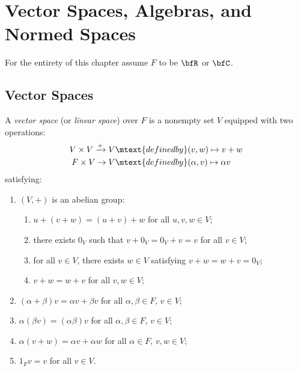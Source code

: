 \chapter{Vector Spaces, Algebras, and Normed Spaces}

\noindent For the entirety of this chapter assume $F$ to be  $\bfR$ or $\bfC$.

\section{Vector Spaces}
    \begin{definition}
        A \textit{vector space} (or \textit{linear space}) over $F$ is a nonempty set $V$ equipped with two operations:
            \begin{equation*}
            \begin{split}
                V \times V \xrightarrow{+} V &\mtext{defined by} (v,w) \mapsto v+w \\
                F \times V \rightarrow V &\mtext{defined by} (\alpha,v) \mapsto \alpha v
            \end{split}
            \end{equation*}
        satisfying:
            \begin{enumerate}[label = (\arabic*),itemsep=1pt,topsep=3pt]
                \item $(V, +)$ is an abelian group:
                    \begin{enumerate}[label = (\roman*),itemsep=1pt,topsep=3pt]
                        \item $u + (v+w) = (u+v) + w$ for all $u,v,w \in V$;
                        \item there exists $0_V$ such that $v + 0_V = 0_V + v = v$ for all $v \in V$;
                        \item for all $v \in V$, there exists $w \in V$ satisfying $v+w = w+v = 0_V$;
                        \item $v + w = w+v$ for all $v,w \in V$;
                    \end{enumerate}

                \item $(\alpha + \beta)v = \alpha v + \beta v$ for all $\alpha,\beta \in F$, $v \in V$;
                \item $\alpha(\beta v) = (\alpha \beta)v$ for all $\alpha,\beta \in F$, $v \in V$;
                \item $\alpha(v+w) = \alpha v + \alpha w$ for all $\alpha \in F$, $v,w \in V$;
                \item $1_F v = v$ for all $v \in V$.
            \end{enumerate}
    \end{definition}

